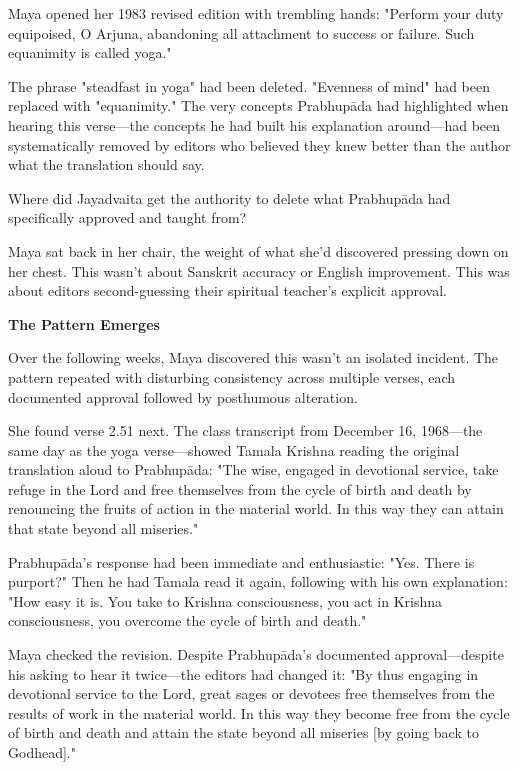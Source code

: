 \documentclass[12pt,twoside]{book}
\begin{document}
Maya opened her 1983 revised edition with trembling hands: "Perform your duty equipoised, O Arjuna, abandoning all attachment to success or failure. Such equanimity is called yoga."

The phrase "steadfast in yoga" had been deleted. "Evenness of mind" had been replaced with "equanimity." The very concepts Prabhupāda had highlighted when hearing this verse—the concepts he had built his explanation around—had been systematically removed by editors who believed they knew better than the author what the translation should say.

Where did Jayadvaita get the authority to delete what Prabhupāda had specifically approved and taught from?

Maya sat back in her chair, the weight of what she'd discovered pressing down on her chest. This wasn't about Sanskrit accuracy or English improvement. This was about editors second-guessing their spiritual teacher's explicit approval.


\vspace{0.5cm}
\textbf{The Pattern Emerges}
\vspace{0.2cm}


Over the following weeks, Maya discovered this wasn't an isolated incident. The pattern repeated with disturbing consistency across multiple verses, each documented approval followed by posthumous alteration.

She found verse 2.51 next. The class transcript from December 16, 1968—the same day as the yoga verse—showed Tamala Krishna reading the original translation aloud to Prabhupāda: "The wise, engaged in devotional service, take refuge in the Lord and free themselves from the cycle of birth and death by renouncing the fruits of action in the material world. In this way they can attain that state beyond all miseries."

Prabhupāda's response had been immediate and enthusiastic: "Yes. There is purport?" Then he had Tamala read it again, following with his own explanation: "How easy it is. You take to Krishna consciousness, you act in Krishna consciousness, you overcome the cycle of birth and death."

Maya checked the revision. Despite Prabhupāda's documented approval—despite his asking to hear it twice—the editors had changed it: "By thus engaging in devotional service to the Lord, great sages or devotees free themselves from the results of work in the material world. In this way they become free from the cycle of birth and death and attain the state beyond all miseries [by going back to Godhead]."
\end{document}
